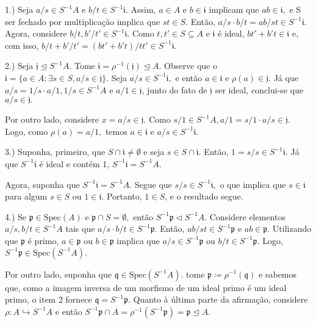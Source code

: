 \documentclass[AlgebraII/algebraII_notes.tex]{subfiles}
\begin{document}
\begin{proof*}
	1.) Seja \(a/s\in S^{-1}A\) e \(b/t\in S^{-1}\mathfrak{i}.\) Assim, \(a\in A\) e \(b\in \mathfrak{i}\) implicam
	que \(ab\in \mathfrak{i},\) e S ser fechado por multiplicação implica que \(st\in S.\) Então, \(a/s \cdot b/t = ab/st\in S^{-1}\mathfrak{i}.\)
	Agora, considere \(b/t, b'/t'\in S^{-1}\mathfrak{i}.\) Como \(t, t'\in S\subseteq A\) e \(\mathfrak{i}\) é ideal, \(bt'+b't\in \mathfrak{i}\) e,
	com isso, \(b/t + b'/t' = (bt'+b't)/t t'\in S^{-1}\mathfrak{i}.\)

	2.) Seja \(\mathfrak{j}\trianglelefteq{S^{-1}A}.\) Tome \(\mathfrak{i} = \rho^{-1}(\mathfrak{j})\trianglelefteq{A}.\) Observe que o
	\(\mathfrak{i} = \{a\in A:\exists s\in S, a/s\in \mathfrak{j}\}\). Seja \(a/s\in S^{-1}\mathfrak{i},\) e então
	\(a\in \mathfrak{i}\) e \(\rho (a)\in \mathfrak{j}.\) Já que \(a/s = 1/s \cdot a/1, 1/s\in S^{-1}A\) e \(a/1\in \mathfrak{j}\),
	junto do fato de \(\mathfrak{j}\) ser ideal, conclui-se que \(a/s\in \mathfrak{j}.\)

	Por outro lado, considere \(x=a/s\in \mathfrak{j}.\) Como \(s/1\in S^{-1}A, a/1 = s/1 \cdot a/s\in \mathfrak{j}.\) Logo,
	como \(\rho (a) = a/1,\) temos \(a\in \mathfrak{i}\) e \(a/s\in S^{-1}\mathfrak{i}.\)

	3.) Suponha, primeiro, que \(S\cap \mathfrak{i} \neq\emptyset\) e seja \(s\in S\cap \mathfrak{i}.\) Então,
	\(1 = s/s\in S^{-1}\mathfrak{i}.\) Já que \(S^{-1}\mathfrak{i}\) é ideal e contém 1, \(S^{-1}\mathfrak{i} = S^{-1}A.\)

	Agora, suponha que \(S^{-1}\mathfrak{i} = S^{-1}A.\) Segue que \(s/s\in S^{-1}\mathfrak{i},\) o que implica que \(s\in \mathfrak{i}\) para algum
	\(s\in S\) ou \(1\in \mathfrak{i}.\) Portanto, \(1\in S\), e o resultado segue.

	4.) Se \(\mathfrak{p}\in \mathrm{Spec}(A)\) e \(\mathfrak{p}\cap S = \emptyset,\) então \(S^{-1}\mathfrak{p}\vartriangleleft S^{-1}A.\)
	Considere elementos \(a/s, b/t\in S^{-1}A\) tais que \(a/s \cdot b/t\in S^{-1}\mathfrak{p}.\) Então, \(ab/st\in S^{-1}\mathfrak{p}\) e \(ab\in \mathfrak{p}.\)
	Utilizando que \(\mathfrak{p}\) é primo, \(a\in \mathfrak{p}\) ou \(b\in \mathfrak{p}\) implica que \(a/s\in S^{-1}\mathfrak{p}\) ou \(b/t\in S^{-1}\mathfrak{p}.\)
	Logo, \(S^{-1}\mathfrak{p}\in \mathrm{Spec}(S^{-1}A).\)

	Por outro lado, suponha que \(\mathfrak{q}\in \mathrm{Spec}(S^{-1}A).\) tome \(\mathfrak{p}\coloneqq \rho^{-1}(\mathfrak{q})\) e
	sabemos que, como a imagem inversa de um morfismo de um ideal primo é um ideal primo, o item 2 fornece \(\mathfrak{q} = S^{-1}\mathfrak{p}.\)
	Quanto à última parte da afirmação, considere \(\rho :A\hookrightarrow S^{-1}A\) e então \(S^{-1}\mathfrak{p}\cap A = \rho^{-1}(S^{-1}\mathfrak{p}) = \mathfrak{p} \trianglelefteq{A}.\) \qedsymbol
\end{proof*}
\end{document}
